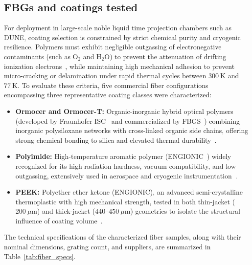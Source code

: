 \documentclass[preprint,11pt]{elsarticle}
\begin{document}
\subsection{FBGs and coatings tested}
\label{subsec:fibers}

For deployment in large-scale noble liquid time projection chambers such as DUNE, coating selection is constrained by strict chemical purity and cryogenic resilience. Polymers must exhibit negligible outgassing of electronegative contaminants (such as $\text{O}_2$ and $\text{H}_2\text{O}$) to prevent the attenuation of drifting ionization electrons~\cite{Acciarri2020ProtoDUNE}, while maintaining high mechanical adhesion to prevent micro-cracking or delamination under rapid thermal cycles between $300~\text{K}$ and $77~\text{K}$. To evaluate these criteria, five commercial fiber configurations encompassing three representative coating classes were characterized:
\begin{itemize}
    \item \textbf{Ormocer and Ormocer-T:} Organic-inorganic hybrid optical polymers (developed by Fraunhofer-ISC~\cite{} and commercialized by FBGS~\cite{}) combining inorganic polysiloxane networks with cross-linked organic side chains, offering strong chemical bonding to silica and elevated thermal durability~\cite{Popall1998}.
    \item \textbf{Polyimide:} High-temperature aromatic polymer (ENGIONIC~\cite{}) widely recognized for its high radiation hardness, vacuum compatibility, and low outgassing, extensively used in aerospace and cryogenic instrumentation~\cite{Zhao2007}.
    \item \textbf{PEEK:} Polyether ether ketone (ENGIONIC), an advanced semi-crystalline thermoplastic with high mechanical strength, tested in both thin-jacket ($200~\mu\text{m}$) and thick-jacket ($440$--$450~\mu\text{m}$) geometries to isolate the structural influence of coating volume~\cite{NIST_CryoMaterials,Rajan2013}.
\end{itemize}

The technical specifications of the characterized fiber samples, along with their nominal dimensions, grating count, and suppliers, are summarized in Table~\ref{tab:fiber_specs}.
\end{document}
